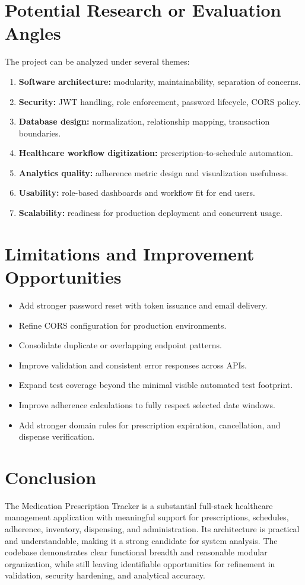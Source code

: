 \documentclass[12pt,a4paper]{article}
\begin{document}
\section{Potential Research or Evaluation Angles}
The project can be analyzed under several themes:
\begin{enumerate}[leftmargin=*]
  \item \textbf{Software architecture:} modularity, maintainability, separation of concerns.
  \item \textbf{Security:} JWT handling, role enforcement, password lifecycle, CORS policy.
  \item \textbf{Database design:} normalization, relationship mapping, transaction boundaries.
  \item \textbf{Healthcare workflow digitization:} prescription-to-schedule automation.
  \item \textbf{Analytics quality:} adherence metric design and visualization usefulness.
  \item \textbf{Usability:} role-based dashboards and workflow fit for end users.
  \item \textbf{Scalability:} readiness for production deployment and concurrent usage.
\end{enumerate}

\section{Limitations and Improvement Opportunities}
\begin{itemize}[leftmargin=*]
  \item Add stronger password reset with token issuance and email delivery.
  \item Refine CORS configuration for production environments.
  \item Consolidate duplicate or overlapping endpoint patterns.
  \item Improve validation and consistent error responses across APIs.
  \item Expand test coverage beyond the minimal visible automated test footprint.
  \item Improve adherence calculations to fully respect selected date windows.
  \item Add stronger domain rules for prescription expiration, cancellation, and dispense verification.
\end{itemize}

\section{Conclusion}
The Medication Prescription Tracker is a substantial full-stack healthcare management application with meaningful support for prescriptions, schedules, adherence, inventory, dispensing, and administration. Its architecture is practical and understandable, making it a strong candidate for system analysis. The codebase demonstrates clear functional breadth and reasonable modular organization, while still leaving identifiable opportunities for refinement in validation, security hardening, and analytical accuracy.
\end{document}
